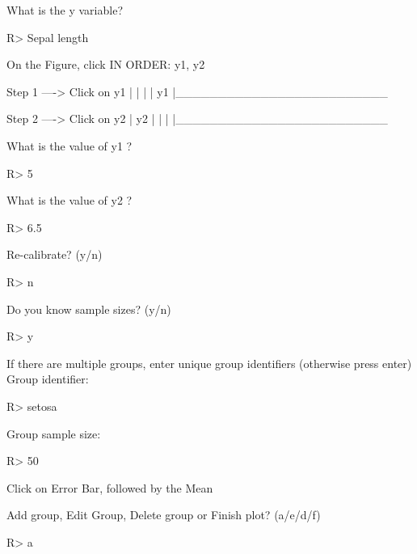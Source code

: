 \documentclass[article]{jss}
\begin{document}
\begin{CodeChunk}
\begin{CodeOutput}
What is the y variable? 
\end{CodeOutput}
\begin{CodeInput}
R> Sepal length
\end{CodeInput}
\begin{CodeOutput}
On the Figure, click IN ORDER: 
      y1, y2  


    Step 1 ----> Click on y1
  |
  |
  |
  |
  y1
  |_________________________


    Step 2 ----> Click on y2
  |
  y2
  |
  |
  |
  |_________________________
  
What is the value of y1 ?
\end{CodeOutput}
\begin{CodeInput}
R> 5
\end{CodeInput}
\begin{CodeOutput}
What is the value of y2 ?
\end{CodeOutput}
\begin{CodeInput}
R> 6.5
\end{CodeInput}
\begin{CodeOutput}
Re-calibrate? (y/n) 
\end{CodeOutput}
\begin{CodeInput}
R> n
\end{CodeInput}
\begin{CodeOutput}
Do you know sample sizes? (y/n)  
\end{CodeOutput}
\begin{CodeInput}
R> y
\end{CodeInput}
\begin{CodeOutput}
If there are multiple groups, enter unique group identifiers (otherwise press enter)
Group identifier: 
\end{CodeOutput}
\begin{CodeInput}
R> setosa
\end{CodeInput}
\begin{CodeOutput}
Group sample size: 
\end{CodeOutput}
\begin{CodeInput}
R> 50
\end{CodeInput}
\begin{CodeOutput}
Click on Error Bar, followed by the Mean

Add group, Edit Group, Delete group or Finish plot? (a/e/d/f) 
\end{CodeOutput}
\begin{CodeInput}
R> a
\end{CodeInput}
\end{CodeChunk}
\end{document}
